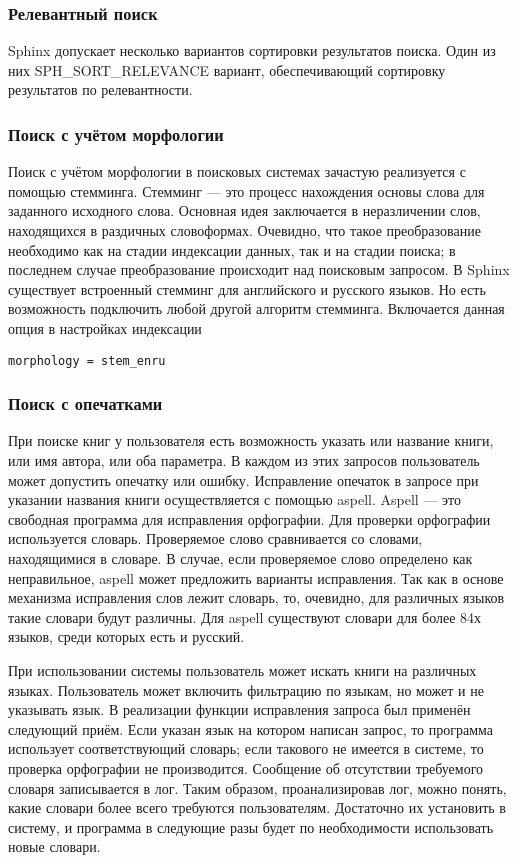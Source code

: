 \subsubsection{Релевантный поиск}

Sphinx допускает несколько вариантов сортировки результатов поиска.
Один из них SPH\_SORT\_RELEVANCE вариант, обеспечивающий сортировку результатов по релевантности.

\subsubsection{Поиск с учётом морфологии}

Поиск с учётом морфологии в поисковых системах зачастую реализуется с помощью стемминга. Стемминг --- это процесс нахождения основы слова для заданного исходного слова.
Основная идея заключается в неразличении слов, находящихся в раздичных словоформах.
Очевидно, что такое преобразование необходимо как на стадии индексации данных, так и на стадии поиска; в последнем случае преобразование происходит над поисковым запросом.
В Sphinx существует встроенный стемминг для английского и русского языков.
Но есть возможность подключить любой другой алгоритм стемминга.
Включается данная опция в настройках индексации 
\begin{verbatim}
morphology = stem_enru
\end{verbatim}
\subsubsection{Поиск с опечатками}

При поиске книг у пользователя есть возможность указать или название книги, или имя автора, или оба параметра. В каждом из этих запросов пользователь может допустить опечатку или ошибку.
Исправление опечаток в запросе при указании названия книги осуществляется с помощью aspell. 
Aspell --- это свободная программа для исправления орфографии.
Для проверки орфографии используется словарь. 
Проверяемое слово сравнивается со словами, находящимися в словаре.
В случае, если проверяемое слово определено как неправильное, aspell может предложить варианты исправления. Так как в основе механизма исправления слов лежит словарь, то, очевидно, для различных языков такие словари будут различны. Для aspell существуют словари для более 84х языков,
среди которых есть и русский.

При использовании системы пользователь может искать книги на различных языках. Пользователь может включить фильтрацию по языкам, но может и не указывать язык.
В реализации функции исправления запроса был применён следующий приём.
Если указан язык на котором написан запрос, то программа использует соответствующий словарь; если такового не имеется в системе, то проверка орфографии не производится. Сообщение об отсутствии требуемого словаря записывается в лог.
Таким образом, проанализировав лог, можно понять, какие словари более всего требуются пользователям. Достаточно их установить в систему, и программа в следующие разы будет по необходимости использовать новые словари.


